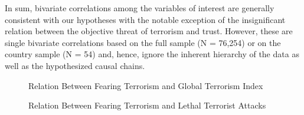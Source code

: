 In sum, bivariate correlations among the variables of interest are generally consistent with our hypotheses with the notable exception of the insignificant relation between the objective threat of terrorism and trust. However, these are single bivariate correlations based on the full sample (N = 76,254) or on the country sample (N = 54) and, hence, ignore the inherent hierarchy of the data as well as the hypothesized causal chains.

\begin{figure}
    \caption{Relation Between Fearing Terrorism and Global Terrorism Index}
    \label{fig:art1-corr1}
\end{figure}

\begin{figure}
    \caption{Relation Between Fearing Terrorism and Lethal Terrorist Attacks}
    \label{fig:art1-corr2}
\end{figure}



